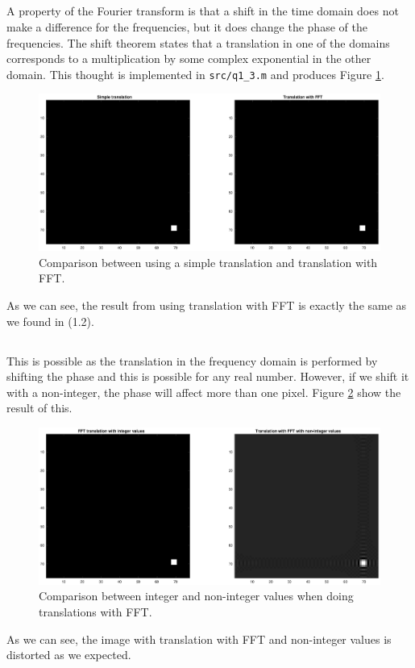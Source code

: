 \documentclass[a4paper]{article}
\begin{document}
\subsection{}
A property of the Fourier transform is that a shift in the time domain does not make a difference for the frequencies, but it does change the phase of the frequencies. The shift theorem states that a translation in one of the domains corresponds to a multiplication by some complex exponential in the other domain. This thought is implemented in \texttt{src/q1\_3.m} and produces Figure \ref{fig7}.
\begin{figure}[H]
  \centering
  \captionsetup{justification=centering}
  \includegraphics[width=\textwidth]{fig7.eps}
  \caption{Comparison between using a simple translation and translation with FFT.}
  \label{fig7}
\end{figure}
As we can see, the result from using translation with FFT is exactly the same as we found in (1.2).

\subsection{}
This is possible as the translation in the frequency domain is performed by shifting the phase and this is possible for any real number. However, if we shift it with a non-integer, the phase will affect more than one pixel. Figure \ref{fig8} show the result of this.
\begin{figure}[H]
  \centering
  \captionsetup{justification=centering}
  \includegraphics[width=\textwidth]{fig8.eps}
  \caption{Comparison between integer and non-integer values when doing translations with FFT.}
  \label{fig8}
\end{figure}
As we can see, the image with translation with FFT and non-integer values is distorted as we expected.
\end{document}

